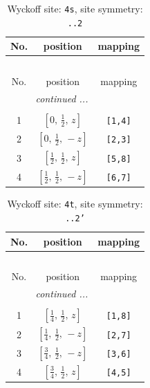 \documentclass[fleqn,8pt]{jsarticle}
\begin{document}
\renewcommand{\arraystretch}{1.2}
\begin{longtable}{ccc}
\caption{Wyckoff site: {\tt 4s}, site symmetry: {\tt ..2}}
 \\
 \hline \hline
No. & position & mapping \\ \hline \endfirsthead

\multicolumn{2}{l}{\tablename\ \thetable{}} \\
 \hline \hline
No. & position & mapping \\ \hline \endhead

 \hline \hline
\multicolumn{2}{r}{\footnotesize\it continued ...} \\ \endfoot

 \hline \hline
\multicolumn{2}{r}{} \\ \endlastfoot

1 & $\left[ 0,\, \frac{1}{2},\, z \right]$ & {\tt [1,4]} \\ \hline
2 & $\left[ 0,\, \frac{1}{2},\, - z \right]$ & {\tt [2,3]} \\ \hline
3 & $\left[ \frac{1}{2},\, \frac{1}{2},\, z \right]$ & {\tt [5,8]} \\ \hline
4 & $\left[ \frac{1}{2},\, \frac{1}{2},\, - z \right]$ & {\tt [6,7]} \\
\end{longtable}
\renewcommand{\arraystretch}{1.2}
\begin{longtable}{ccc}
\caption{Wyckoff site: {\tt 4t}, site symmetry: {\tt ..2'}}
 \\
 \hline \hline
No. & position & mapping \\ \hline \endfirsthead

\multicolumn{2}{l}{\tablename\ \thetable{}} \\
 \hline \hline
No. & position & mapping \\ \hline \endhead

 \hline \hline
\multicolumn{2}{r}{\footnotesize\it continued ...} \\ \endfoot

 \hline \hline
\multicolumn{2}{r}{} \\ \endlastfoot

1 & $\left[ \frac{1}{4},\, \frac{1}{2},\, z \right]$ & {\tt [1,8]} \\ \hline
2 & $\left[ \frac{1}{4},\, \frac{1}{2},\, - z \right]$ & {\tt [2,7]} \\ \hline
3 & $\left[ \frac{3}{4},\, \frac{1}{2},\, - z \right]$ & {\tt [3,6]} \\ \hline
4 & $\left[ \frac{3}{4},\, \frac{1}{2},\, z \right]$ & {\tt [4,5]} \\
\end{longtable}
\end{document}
